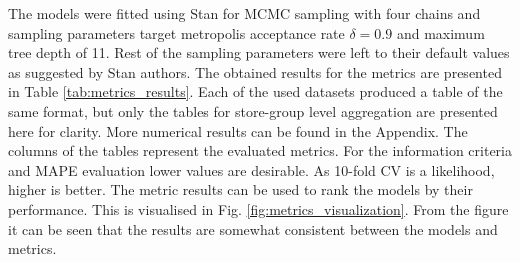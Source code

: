 \documentclass[english, 12pt, a4paper, sci, utf8, a-1b, online]{aaltothesis}
\begin{document}









The models were fitted using Stan for MCMC sampling with four chains and sampling parameters target metropolis acceptance rate $\delta = 0.9$ and maximum tree depth of 11. Rest of the sampling parameters were left to their default values as suggested by Stan authors. The obtained results for the metrics are presented in Table \ref{tab:metrics_results}. Each of the used datasets produced a table of the same format, but only the tables for store-group level aggregation are presented here for clarity. More numerical results can be found in the Appendix. The columns of the tables represent the evaluated metrics. For the information criteria and MAPE evaluation lower values are desirable. As 10-fold CV is a likelihood, higher is better. The metric results can be used to rank the models by their performance. This is visualised in Fig. \ref{fig:metrics_visualization}. From the figure it can be seen that the results are somewhat consistent between the models and metrics.

\end{document}
